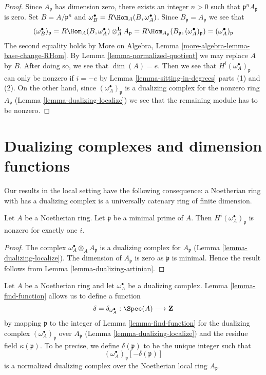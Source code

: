 \begin{proof}
Since $A_\mathfrak p$ has dimension zero, there exists an integer
$n > 0$ such that $\mathfrak p^nA_\mathfrak p$ is zero.
Set $B = A/\mathfrak p^n$ and
$\omega_B^\bullet = R\Hom_A(B, \omega_A^\bullet)$.
Since $B_\mathfrak p = A_\mathfrak p$ we see that
$$
(\omega_B^\bullet)_\mathfrak p =
R\Hom_A(B, \omega_A^\bullet) \otimes_A^\mathbf{L} A_\mathfrak p =
R\Hom_{A_\mathfrak p}(B_\mathfrak p, (\omega_A^\bullet)_\mathfrak p) =
(\omega_A^\bullet)_\mathfrak p
$$
The second equality holds by
More on Algebra, Lemma \ref{more-algebra-lemma-base-change-RHom}.
By Lemma \ref{lemma-normalized-quotient} we may replace $A$ by $B$.
After doing so, we see that $\dim(A) = e$. Then we see that
$H^i(\omega_A^\bullet)_\mathfrak p$ can only be nonzero if $i = -e$
by Lemma \ref{lemma-sitting-in-degrees} parts (1) and (2).
On the other hand, since $(\omega_A^\bullet)_\mathfrak p$
is a dualizing complex for the nonzero ring $A_\mathfrak p$
(Lemma \ref{lemma-dualizing-localize})
we see that the remaining module has to be nonzero.
\end{proof}





\section{Dualizing complexes and dimension functions}
\label{section-dimension-function}

\noindent
Our results in the local setting have the following consequence:
a Noetherian ring with has a dualizing complex is a
universally catenary ring of finite dimension.

\begin{lemma}
\label{lemma-nonvanishing-generically}
Let $A$ be a Noetherian ring. Let $\mathfrak p$ be a minimal prime
of $A$. Then $H^i(\omega_A^\bullet)_\mathfrak p$ is nonzero
for exactly one $i$.
\end{lemma}

\begin{proof}
The complex $\omega_A^\bullet \otimes_A A_\mathfrak p$
is a dualizing complex for $A_\mathfrak p$
(Lemma \ref{lemma-dualizing-localize}).
The dimension of $A_\mathfrak p$ is zero as $\mathfrak p$
is minimal. Hence the result follows from
Lemma \ref{lemma-dualizing-artinian}.
\end{proof}

\noindent
Let $A$ be a Noetherian ring and let $\omega_A^\bullet$ be a dualizing
complex. Lemma \ref{lemma-find-function} allows us to define a function
$$
\delta = \delta_{\omega_A^\bullet} : \Spec(A) \longrightarrow \mathbf{Z}
$$
by mapping $\mathfrak p$ to the integer of Lemma \ref{lemma-find-function}
for the dualizing complex $(\omega_A^\bullet)_\mathfrak p$
over $A_\mathfrak p$ (Lemma \ref{lemma-dualizing-localize})
and the residue field $\kappa(\mathfrak p)$. To be precise, we define
$\delta(\mathfrak p)$ to be the unique integer such that
$$
(\omega_A^\bullet)_\mathfrak p[-\delta(\mathfrak p)]
$$
is a normalized dualizing complex over the Noetherian local ring
$A_\mathfrak p$.

